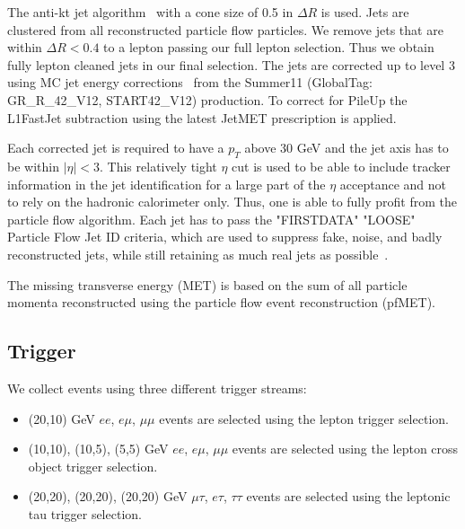 The anti-kt jet algorithm~\cite{antiKT} with a cone size of 0.5 in $\Delta R$ is used. 
Jets are clustered from all reconstructed particle flow particles.
We remove jets that are within $\Delta R < 0.4$ to a lepton passing our
full lepton selection. Thus we obtain fully lepton cleaned jets in our final selection.
The jets are corrected up to level 3 using MC jet energy corrections~\cite{mcjetcorrections}
from the Summer11 (GlobalTag: GR\_R\_42\_V12, START42\_V12) production. 
To correct for PileUp the L1FastJet subtraction using the latest JetMET
prescription is applied.

Each corrected jet is required to have a $p_T$ above 30 GeV and 
the jet axis has to be within $|\eta| < 3$. This relatively tight $\eta$ cut is used 
to be able to include tracker information in the jet identification for a large part of the $\eta$ acceptance and 
not to rely on the hadronic calorimeter only. 
Thus, one is able to fully profit from the particle flow algorithm.
Each jet has to pass the "FIRSTDATA" "LOOSE" Particle Flow Jet ID criteria, which
are used to suppress fake, noise, and badly reconstructed jets, while
still retaining as much real jets as possible~\cite{pfjetid}.

The missing transverse energy (MET) is based on the sum of all particle 
momenta reconstructed using the particle flow event reconstruction (pfMET).

\subsection{Trigger}\label{sec:trigger}

We collect events using three different trigger streams:
\begin{itemize}
\item (20,10) GeV $ee$, $e\mu$, $\mu\mu$ events are selected using the lepton trigger selection.
\item (10,10), (10,5), (5,5) GeV $ee$, $e\mu$, $\mu\mu$ events are selected using the lepton \HT cross object trigger selection.
\item (20,20), (20,20), (20,20) GeV $\mu\tau$, $e\tau$, $\tau\tau$ events are selected using the leptonic tau trigger selection.
\end{itemize}

